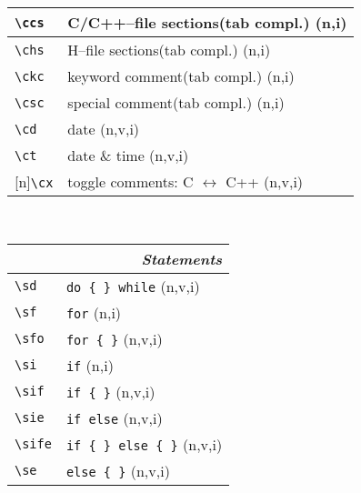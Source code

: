 \documentclass[oneside,11pt,landscape,DIV17]{scrartcl}
\newcommand{\Rep}{{\tiny{[n]}}}
\begin{document}
\begin{multicols}{3}
\begin{center}
\begin{tabular}[]{|p{10mm}|p{60mm}|}
\hline \verb'\ccs'& C/C++--file sections\hspace{3mm}\footnotesize{(tab compl.)}    \hfill \normalsize{(n,i)}\\
\hline \verb'\chs'& H--file sections\hspace{10mm}\footnotesize{(tab compl.)}       \hfill \normalsize{(n,i)}\\
\hline \verb'\ckc'& keyword comment\hspace{5mm}\footnotesize{(tab compl.)}         \hfill \normalsize{(n,i)}\\
\hline \verb'\csc'& special comment\hspace{7,5mm}\footnotesize{(tab compl.)}       \hfill \normalsize{(n,i)}\\

\hline \verb'\cd' & date                                    \hfill (n,v,i)\\
\hline \verb'\ct' & date \& time                            \hfill (n,v,i)\\
\hline \Rep\verb'\cx' & toggle comments: C $\leftrightarrow$ C++                  \hfill (n,v,i)\\
\hline
\end{tabular}\\
%
%
\begin{tabular}[]{|p{15mm}|p{55mm}|}
\hline
\multicolumn{2}{|r|}{\textsl{\textbf{S}tatements}} \\
\hline \verb'\sd'  & \verb'do { } while'        \hfill (n,v,i)\\
\hline \verb'\sf'  & \verb'for'                 \hfill (n,i)\\
\hline \verb'\sfo' & \verb'for { }'             \hfill (n,v,i)\\
\hline \verb'\si'  & \verb'if'                  \hfill (n,i)\\
\hline \verb'\sif' & \verb'if { }'              \hfill (n,v,i)\\
\hline \verb'\sie' & \verb'if else'             \hfill (n,v,i)\\
\hline \verb'\sife'& \verb'if { } else { }'     \hfill (n,v,i)\\
\hline \verb'\se'  & \verb'else { }'            \hfill (n,v,i)\\

\end{tabular}
\end{center}
\end{multicols}
\end{document}
